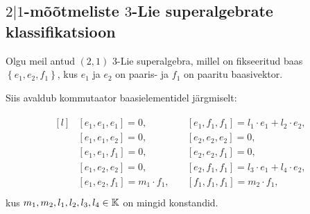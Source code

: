 
\subsection{\texorpdfstring{$2|1$}{1|2}-mõõtmeliste
    \texorpdfstring{$3$}{3}-Lie superalgebrate klassifikatsioon}

Olgu meil antud $(2, 1)$ 3-Lie superalgebra, millel on fikseeritud baas
$\left\{ e_1, e_2, f_1 \right\}$, kus $e_1$ ja $e_2$ on paaris- ja
$f_1$ on paaritu baasivektor.

Siis avaldub kommutaator baasielementidel järgmiselt:

\begin{align}\label{samasused:2-1}
    \begin{matrix*}[l]
        & \left[e_1, e_1, e_1\right] = 0,
        & \left[e_1, f_1, f_1\right] = l_1 \cdot e_1 + l_2 \cdot e_2, \\
        & \left[e_1, e_1, e_2\right] = 0,
        & \left[e_2, e_2, e_2\right] = 0, \\
        & \left[e_1, e_1, f_1\right] = 0,
        & \left[e_2, e_2, f_1\right] = 0, \\
        & \left[e_1, e_2, e_2\right] = 0,
        & \left[e_2, f_1, f_1\right] = l_3 \cdot e_1 + l_4 \cdot e_2, \\
        & \left[e_1, e_2, f_1\right] = m_1 \cdot f_1,\quad
        & \left[f_1, f_1, f_1\right] = m_2 \cdot f_1, \\
    \end{matrix*}
\end{align}
kus $m_1, m_2, l_1, l_2, l_3, l_4 \in \mathbb{K}$ on mingid konstandid.

